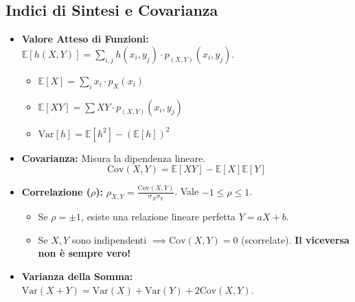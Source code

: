 \documentclass[12pt]{extarticle} %
\begin{document}
\subsection{Indici di Sintesi e Covarianza}
\begin{itemize}
    \item \textbf{Valore Atteso di Funzioni:} $\mathbb{E}[h(X,Y)] = \sum_{i,j} h(x_i, y_j) \cdot p_{(X,Y)}(x_i, y_j)$.
    \begin{itemize}
        \item $\mathbb{E}[X] = \sum_i x_i \cdot p_X(x_i)$
        \item $\mathbb{E}[XY] = \sum XY \cdot p_{(X,Y)}(x_i,y_j)$
        \item $\text{Var}[h] = \mathbb{E}[h^2] - (\mathbb{E}[h])^2$
    \end{itemize}
    \item \textbf{Covarianza:} Misura la dipendenza lineare. 
    \[ \mathrm{Cov}(X,Y) = \mathbb{E}[XY] - \mathbb{E}[X]\mathbb{E}[Y] \]
    \item \textbf{Correlazione ($\rho$):} $\rho_{X,Y} = \frac{\mathrm{Cov}(X,Y)}{\sigma_X \sigma_Y}$. Vale $-1 \le \rho \le 1$.
    \begin{itemize}
        \item Se $\rho = \pm 1$, esiste una relazione lineare perfetta $Y = aX + b$.
        \item Se $X, Y$ sono indipendenti $\implies \mathrm{Cov}(X,Y) = 0$ (scorrelate). \textbf{Il viceversa non è sempre vero!}
    \end{itemize}
    \item \textbf{Varianza della Somma:} $\mathrm{Var}(X+Y) = \mathrm{Var}(X) + \mathrm{Var}(Y) + 2\mathrm{Cov}(X,Y)$.
\end{itemize}
\end{document}
